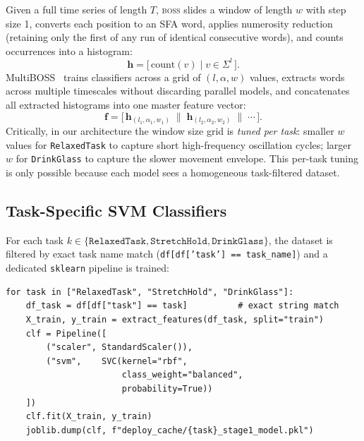 \documentclass[12pt, a4paper]{article}
\newcommand{\boss}{\textsc{boss}}
\begin{document}
Given a full time series of length $T$, \boss{} slides a window of
length $w$ with step size 1, converts each position to an SFA word,
applies numerosity reduction (retaining only the first of any run of
identical consecutive words), and counts occurrences into a histogram:
\begin{equation}
  \mathbf{h} = \bigl[\,\mathrm{count}(v) \mid v \in \Sigma^l\,\bigr].
  \label{eq:hist}
\end{equation}
MultiBOSS~\cite{boss} trains classifiers across a grid of $(l, \alpha, w)$
values, extracts words across multiple timescales without discarding parallel models,
and concatenates all extracted histograms into one master feature vector:
\begin{equation}
  \mathbf{f} = \bigl[\,\mathbf{h}_{(l_1,\alpha_1,w_1)} \;\|\;
                        \mathbf{h}_{(l_2,\alpha_2,w_2)} \;\|\;
                        \cdots\,\bigr].
  \label{eq:multiboss}
\end{equation}
Critically, in our architecture the window size grid is \emph{tuned
per task}: smaller $w$ values for \texttt{RelaxedTask} to capture
short high-frequency oscillation cycles; larger $w$ for \texttt{DrinkGlass}
to capture the slower movement envelope. This per-task tuning is only
possible because each model sees a homogeneous task-filtered dataset.

\subsection{Task-Specific SVM Classifiers}

For each task $k \in \{\texttt{RelaxedTask}, \texttt{StretchHold},
\texttt{DrinkGlass}\}$, the dataset is filtered by exact task name
match (\texttt{df[df['task'] == task\_name]}) and a dedicated
\texttt{sklearn} pipeline is trained:

\begin{lstlisting}[caption={Task-specific pipeline training loop.},
                   label={lst:pipeline}]
for task in ["RelaxedTask", "StretchHold", "DrinkGlass"]:
    df_task = df[df["task"] == task]          # exact string match
    X_train, y_train = extract_features(df_task, split="train")
    clf = Pipeline([
        ("scaler", StandardScaler()),
        ("svm",    SVC(kernel="rbf",
                       class_weight="balanced",
                       probability=True))
    ])
    clf.fit(X_train, y_train)
    joblib.dump(clf, f"deploy_cache/{task}_stage1_model.pkl")
\end{lstlisting}
\end{document}
